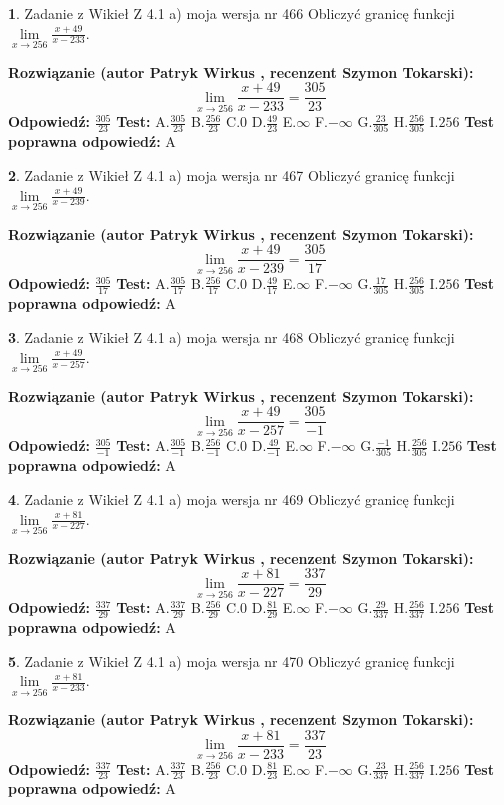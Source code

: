 \documentclass[12pt, a4paper]{article}
\theoremstyle{definition} %
\newtheorem{zad}{}
\newcommand{\zadStart}[1]{\begin{zad}#1\newline}
\newcommand{\zadStop}{\end{zad}}
\newcommand{\rozwStart}[2]{\noindent \textbf{Rozwiązanie (autor #1 , recenzent #2): }\newline}
\newcommand{\rozwStop}{\newline}
\newcommand{\odpStart}{\noindent \textbf{Odpowiedź:}\newline}
\newcommand{\odpStop}{\newline}
\newcommand{\testStart}{\noindent \textbf{Test:}\newline}
\newcommand{\testStop}{\newline}
\newcommand{\kluczStart}{\noindent \textbf{Test poprawna odpowiedź:}\newline}
\newcommand{\kluczStop}{\newline}
\begin{document}
\zadStart{Zadanie z Wikieł Z 4.1 a) moja wersja nr 466}
Obliczyć granicę funkcji $\lim\limits_{x\to256}\frac{x+49}{x-233}$.
\zadStop
\rozwStart{Patryk Wirkus}{Szymon Tokarski}
$$\lim\limits_{x\to256}\frac{x+49}{x-233} = \frac{305}{23}$$
\rozwStop
\odpStart
$\frac{305}{23}$
\odpStop
\testStart
A.$\frac{305}{23}$
B.$\frac{256}{23}$
C.$0$
D.$\frac{49}{23}$
E.$\infty$
F.$-\infty$
G.$\frac{23}{305}$
H.$\frac{256}{305}$
I.$256$
\testStop
\kluczStart
A
\kluczStop



\zadStart{Zadanie z Wikieł Z 4.1 a) moja wersja nr 467}
Obliczyć granicę funkcji $\lim\limits_{x\to256}\frac{x+49}{x-239}$.
\zadStop
\rozwStart{Patryk Wirkus}{Szymon Tokarski}
$$\lim\limits_{x\to256}\frac{x+49}{x-239} = \frac{305}{17}$$
\rozwStop
\odpStart
$\frac{305}{17}$
\odpStop
\testStart
A.$\frac{305}{17}$
B.$\frac{256}{17}$
C.$0$
D.$\frac{49}{17}$
E.$\infty$
F.$-\infty$
G.$\frac{17}{305}$
H.$\frac{256}{305}$
I.$256$
\testStop
\kluczStart
A
\kluczStop



\zadStart{Zadanie z Wikieł Z 4.1 a) moja wersja nr 468}
Obliczyć granicę funkcji $\lim\limits_{x\to256}\frac{x+49}{x-257}$.
\zadStop
\rozwStart{Patryk Wirkus}{Szymon Tokarski}
$$\lim\limits_{x\to256}\frac{x+49}{x-257} = \frac{305}{-1}$$
\rozwStop
\odpStart
$\frac{305}{-1}$
\odpStop
\testStart
A.$\frac{305}{-1}$
B.$\frac{256}{-1}$
C.$0$
D.$\frac{49}{-1}$
E.$\infty$
F.$-\infty$
G.$\frac{-1}{305}$
H.$\frac{256}{305}$
I.$256$
\testStop
\kluczStart
A
\kluczStop



\zadStart{Zadanie z Wikieł Z 4.1 a) moja wersja nr 469}
Obliczyć granicę funkcji $\lim\limits_{x\to256}\frac{x+81}{x-227}$.
\zadStop
\rozwStart{Patryk Wirkus}{Szymon Tokarski}
$$\lim\limits_{x\to256}\frac{x+81}{x-227} = \frac{337}{29}$$
\rozwStop
\odpStart
$\frac{337}{29}$
\odpStop
\testStart
A.$\frac{337}{29}$
B.$\frac{256}{29}$
C.$0$
D.$\frac{81}{29}$
E.$\infty$
F.$-\infty$
G.$\frac{29}{337}$
H.$\frac{256}{337}$
I.$256$
\testStop
\kluczStart
A
\kluczStop



\zadStart{Zadanie z Wikieł Z 4.1 a) moja wersja nr 470}
Obliczyć granicę funkcji $\lim\limits_{x\to256}\frac{x+81}{x-233}$.
\zadStop
\rozwStart{Patryk Wirkus}{Szymon Tokarski}
$$\lim\limits_{x\to256}\frac{x+81}{x-233} = \frac{337}{23}$$
\rozwStop
\odpStart
$\frac{337}{23}$
\odpStop
\testStart
A.$\frac{337}{23}$
B.$\frac{256}{23}$
C.$0$
D.$\frac{81}{23}$
E.$\infty$
F.$-\infty$
G.$\frac{23}{337}$
H.$\frac{256}{337}$
I.$256$
\testStop
\kluczStart
A
\kluczStop
\end{document}
